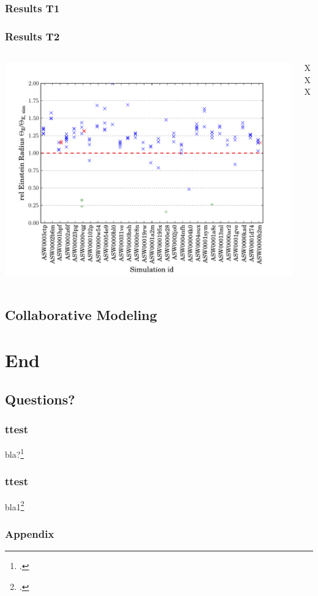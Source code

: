 \documentclass[aspectratio=1610]{beamer}
\begin{document}
\begin{frame}
  \frametitle{Results T1}
  
\end{frame}

\begin{frame}
  \frametitle{Results T2}
  \begin{columns}[c]\begin{column}{0.66\textwidth}
    \includegraphics[height=0.9\textheight]{imgs/eR_4}
  \end{column}\begin{column}{0.33\textwidth}
    {\color{red}XXX}
  \end{column}\end{columns}
\end{frame}


\subsection{Collaborative Modeling}

\section*{End}
\subsection*{Questions?}





\begin{frame}
  \frametitle{ttest}
  bla?\footcite{glass-jc}
\end{frame}

\begin{frame}
  \frametitle{ttest}
  bla1\footcite{glass-jc}
\end{frame}

\appendix

\begin{frame}
  \frametitle{Appendix}
\end{frame}

\begin{frame}
\end{frame}
\end{document}
